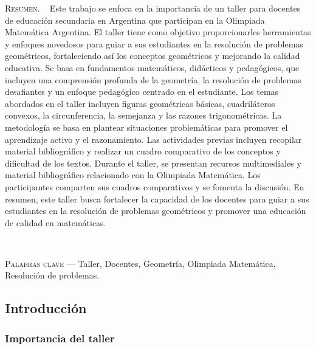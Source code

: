 \begin{center}
	\begin{minipage}{0.75\linewidth} \small
		\textsc{Resumen}. ~
		Este trabajo se enfoca en la importancia de un taller para docentes de educación secundaria en Argentina que participan en la Olimpiada Matemática Argentina. El taller tiene como objetivo proporcionarles herramientas y enfoques novedosos para guiar a sus estudiantes en la resolución de problemas geométricos, fortaleciendo así los conceptos geométricos y mejorando la calidad educativa. Se basa en fundamentos matemáticos, didácticos y pedagógicos, que incluyen una comprensión profunda de la geometría, la resolución de problemas desafiantes y un enfoque pedagógico centrado en el estudiante. Los temas abordados en el taller incluyen figuras geométricas básicas, cuadriláteros convexos, la circunferencia, la semejanza y las razones trigonométricas. La metodología se basa en plantear situaciones problemáticas para promover el aprendizaje activo y el razonamiento. Las actividades previas incluyen recopilar material bibliográfico y realizar un cuadro comparativo de los conceptos y dificultad de los textos. Durante el taller, se presentan recursos multimediales y material bibliográfico relacionado con la Olimpiada Matemática. Los participantes comparten sus cuadros comparativos y se fomenta la discusión. En resumen, este taller busca fortalecer la capacidad de los docentes para guiar a sus estudiantes en la resolución de problemas geométricos y promover una educación de calidad en matemáticas.
	\end{minipage}\\
	
	\vspace{0.5em}
	
	\begin{minipage}{0.75\linewidth} \small
		\textsc{Palabras clave} --- Taller, Docentes, Geometría, Olimpiada Matemática, Resolución de problemas.
	\end{minipage}
\end{center}

\subsection{Introducción}

\subsubsection{Importancia del taller}

